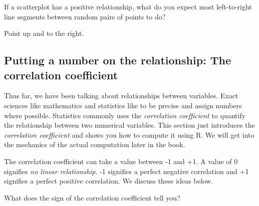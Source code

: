 \documentclass[
  12pt,
  letterpaper,
  DIV=11,
  numbers=noendperiod]{scrreprt}
\begin{document}
\begin{tcolorbox}[enhanced jigsaw, colback=white, leftrule=.75mm, toprule=.15mm, bottomtitle=1mm, breakable, coltitle=black, toptitle=1mm, title={Quick Check}, opacitybacktitle=0.6, colbacktitle=quarto-callout-note-color!10!white, arc=.35mm, left=2mm, colframe=quarto-callout-note-color-frame, titlerule=0mm, rightrule=.15mm, bottomrule=.15mm, opacityback=0]

If a scatterplot has a positive relationship, what do you expect most
left-to-right line segments between random pairs of points to do?

\end{tcolorbox}

\begin{tcolorbox}[enhanced jigsaw, colback=white, leftrule=.75mm, toprule=.15mm, bottomtitle=1mm, breakable, coltitle=black, toptitle=1mm, title={Suggested answer}, opacitybacktitle=0.6, colbacktitle=quarto-callout-note-color!10!white, arc=.35mm, left=2mm, colframe=quarto-callout-note-color-frame, titlerule=0mm, rightrule=.15mm, bottomrule=.15mm, opacityback=0]

Point up and to the right.

\end{tcolorbox}

\subsection{Putting a number on the relationship: The correlation
coefficient}\label{putting-a-number-on-the-relationship-the-correlation-coefficient}

Thus far, we have been talking about relationships between variables.
Exact sciences like mathematics and statistics like to be precise and
assign numbers where possible. Statistics commonly uses the
\emph{correlation coefficient} to quantify the relationship between two
numerical variables. This section just introduces the \emph{correlation
coefficient} and shows you how to compute it using R. We will get into
the mechanics of the actual computation later in the book.

The correlation coefficient can take a value between -1 and +1. A value
of 0 signifies \emph{no linear relationship}. -1 signifies a perfect
negative correlation and +1 signifies a perfect positive correlation. We
discuss these ideas below.

\begin{tcolorbox}[enhanced jigsaw, colback=white, leftrule=.75mm, toprule=.15mm, bottomtitle=1mm, breakable, coltitle=black, toptitle=1mm, title={Quick Check}, opacitybacktitle=0.6, colbacktitle=quarto-callout-note-color!10!white, arc=.35mm, left=2mm, colframe=quarto-callout-note-color-frame, titlerule=0mm, rightrule=.15mm, bottomrule=.15mm, opacityback=0]

What does the sign of the correlation coefficient tell you?

\end{tcolorbox}
\end{document}
